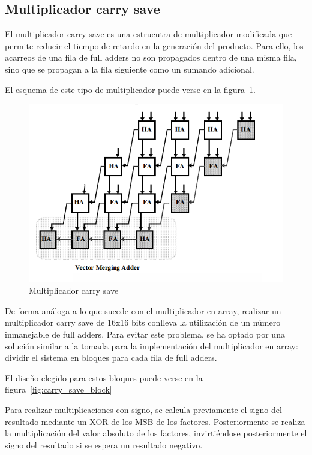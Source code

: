 \documentclass[a4paper,12pt]{article}
\begin{document}
\clearpage
\subsection{Multiplicador carry save}
El multiplicador carry save es una estrucutra de multiplicador modificada que permite reducir el tiempo de retardo en la generación del producto. Para ello, los acarreos de una fila de full adders no son propagados dentro de una misma fila, sino que se propagan a la fila siguiente como un sumando adicional.

El esquema de este tipo de multiplicador puede verse en la figura~\ref{fig:carry_save_multiplier}.

\begin{figure}[hbt]
\includegraphics[width=\textwidth]{img/carry_save_mult.png} 
\caption{Multiplicador carry save} \label{fig:carry_save_multiplier}
\end{figure}

De forma análoga a lo que sucede con el multiplicador en array, realizar un multiplicador carry save de 16x16 bits conlleva la utilización de un número inmanejable de full adders. Para evitar este problema, se ha optado por una solución similar a la tomada para la implementación del multiplicador en array: dividir el sistema en bloques para cada fila de full adders.

El diseño elegido para estos bloques puede verse en la figura~\ref{fig:carry_save_block}

Para realizar multiplicaciones con signo, se calcula previamente el signo del resultado mediante un XOR de los MSB de los factores. Posteriormente se realiza la multiplicación del valor absoluto de los factores, invirtiéndose posteriormente el signo del resultado si se espera un resultado negativo.
\end{document}
